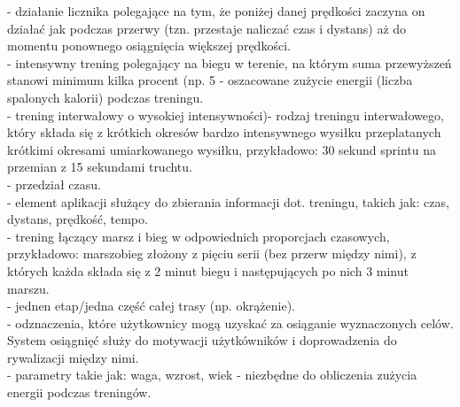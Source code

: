 	\hspace{10 mm} - działanie licznika polegające na tym, że poniżej danej prędkości zaczyna on działać jak podczas przerwy (tzn. przestaje naliczać czas i dystans) aż do momentu ponownego osiągnięcia większej prędkości.\\
	\hspace{10 mm} - intensywny trening polegający na biegu w terenie, na którym suma przewyższeń stanowi minimum kilka procent (np. 5%
	\hspace{10 mm} - oszacowane zużycie energii (liczba spalonych kalorii) podczas treningu.\\
	\hspace{10 mm} - trening interwałowy o wysokiej intensywności)- rodzaj treningu interwałowego, który składa się z krótkich okresów bardzo intensywnego wysiłku przeplatanych krótkimi okresami umiarkowanego wysiłku, przykładowo: 30 sekund sprintu na przemian z 15 sekundami truchtu.\\
	\hspace{10 mm} - przedział czasu.\\
	\hspace{10 mm} - element aplikacji służący do zbierania informacji dot. treningu, takich jak: czas, dystans, prędkość, tempo.\\
	\hspace{10 mm} - trening łączący marsz i bieg w odpowiednich proporcjach czasowych, przykładowo: marszobieg złożony z pięciu serii (bez przerw między nimi), z których każda składa się z 2 minut biegu i następujących po nich 3 minut marszu.\\
	\hspace{10 mm} - jednen etap/jedna część całej trasy (np. okrążenie).\\
	\hspace{10 mm} - odznaczenia, które użytkownicy mogą uzyskać za osiąganie wyznaczonych celów. System osiągnięć służy do motywacji użytkówników i doprowadzenia do rywalizacji między nimi.\\
	\hspace{10 mm} - parametry takie jak: waga, wzrost, wiek - niezbędne do obliczenia zużycia energii podczas treningów.\\
